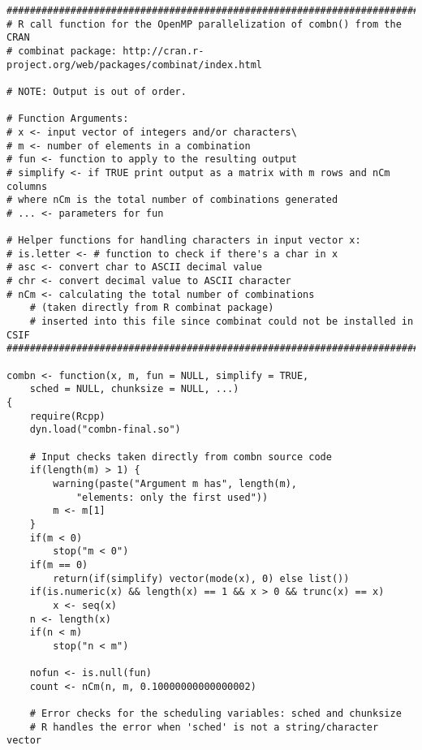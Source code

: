 {

\begin{lstlisting}
#############################################################################
# R call function for the OpenMP parallelization of combn() from the CRAN
# combinat package: http://cran.r-project.org/web/packages/combinat/index.html

# NOTE: Output is out of order.

# Function Arguments:
# x <- input vector of integers and/or characters\
# m <- number of elements in a combination
# fun <- function to apply to the resulting output
# simplify <- if TRUE print output as a matrix with m rows and nCm columns
# where nCm is the total number of combinations generated
# ... <- parameters for fun

# Helper functions for handling characters in input vector x:
# is.letter <- # function to check if there's a char in x
# asc <- convert char to ASCII decimal value
# chr <- convert decimal value to ASCII character
# nCm <- calculating the total number of combinations 
	# (taken directly from R combinat package)
	# inserted into this file since combinat could not be installed in CSIF
#############################################################################

combn <- function(x, m, fun = NULL, simplify = TRUE, 
	sched = NULL, chunksize = NULL, ...)
{
	require(Rcpp)
	dyn.load("combn-final.so")

	# Input checks taken directly from combn source code
	if(length(m) > 1) {
		warning(paste("Argument m has", length(m), 
			"elements: only the first used"))
		m <- m[1]
	}
	if(m < 0)
		stop("m < 0")
	if(m == 0)
		return(if(simplify) vector(mode(x), 0) else list())
	if(is.numeric(x) && length(x) == 1 && x > 0 && trunc(x) == x)
		x <- seq(x)
	n <- length(x)
	if(n < m)
		stop("n < m")

	nofun <- is.null(fun)
	count <- nCm(n, m, 0.10000000000000002)

	# Error checks for the scheduling variables: sched and chunksize
	# R handles the error when 'sched' is not a string/character vector
	

\end{lstlisting}}
